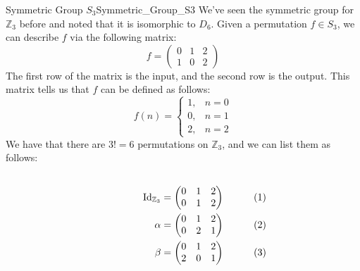     \begin{lexample}{Symmetric Group $S_{3}$}{Symmetric_Group_S3}
        We've seen the symmetric group for $\mathbb{Z}_{3}$ before and noted
        that it is isomorphic to $D_{6}$. Given a permutation $f\in{S}_{3}$, we
        can describe $f$ via the following matrix:
        \begin{equation}
            f=
            \begin{pmatrix}
                0&1&2\\
                1&0&2
            \end{pmatrix}
        \end{equation}
        The first row of the matrix is the input, and the second row is the
        output. This matrix tells us that $f$ can be defined as follows:
        \begin{equation}
            f(n)=
            \begin{cases}
                1,&n=0\\
                0,&n=1\\
                2,&n=2
            \end{cases}
        \end{equation}
        We have that there are $3!=6$ permutations on $\mathbb{Z}_{3}$, and we
        can list them as follows:
        \par
        \begin{subequations}
            \begin{minipage}[b]{0.49\textwidth}
                \centering
                \begin{align}
                    \textrm{Id}_{\mathbb{Z}_{3}}&=
                    \begin{pmatrix}
                        0&1&2\\
                        0&1&2
                    \end{pmatrix}\\
                    \alpha&=
                    \begin{pmatrix}
                        0&1&2\\
                        0&2&1
                    \end{pmatrix}\\
                    \beta&=
                    \begin{pmatrix}
                        0&1&2\\
                        2&0&1
                    \end{pmatrix}

\end{align}
\end{minipage}
\end{subequations}
\end{lexample}
